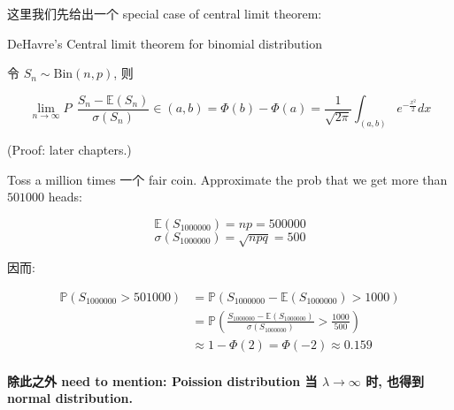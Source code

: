 \documentclass{qlnotes-export}
\begin{document}
这里我们先给出一个 special case of central limit theorem:

\begin{theorem}{DeHavre's Central limit theorem for binomial distribution}\label{thm-02-random-variables-dehavres-central-limit-theorem-for-binomial-distribution}

令 \(S_{n} \sim \text{Bin}(n,p)\), 则

\[\lim\limits_{n\rightarrow\infty}P\ \ \frac{S_{n} - {\mathbb{E}}(S_{n})}{\sigma(S_{n})} \in (a,b) = \Phi(b) - \Phi(a) = \frac{1}{\sqrt{2\pi}}\int_{(a,b)}e^{- \frac{x^{2}}{2}} dx\]

\end{theorem}

(Proof: later chapters.)

\begin{example}\label{ex-02-random-variables-example-012}

Toss a million times 一个 fair coin. Approximate the prob that we get more than \(501000\) heads:

\[{\mathbb{E}}(S_{1000000}) = np = 500000\]\[\sigma(S_{1000000}) = \sqrt{npq} = 500\]

因而:

\[\begin{matrix}
{{\mathbb{P}}(S_{1000000} > 501000)} & {= {\mathbb{P}}(S_{1000000} - {\mathbb{E}}(S_{1000000}) > 1000)} \\
 & {= {\mathbb{P}}\left( {\frac{S_{1000000} - {\mathbb{E}}(S_{1000000})}{\sigma(S_{1000000})} > \frac{1000}{500}} \right)} \\
 & {\approx 1 - \Phi(2) = \Phi( - 2) \approx 0.159}
\end{matrix}\]

\end{example}

\paragraph{\texorpdfstring{除此之外 need to mention: Poission distribution 当 \(\lambda\rightarrow\infty\) 时, 也得到 normal distribution.\\
}{除此之外 need to mention: Poission distribution 当 \textbackslash lambda\textbackslash rightarrow\textbackslash infty 时, 也得到 normal distribution. }}\label{ux9664ux6b64ux4e4bux5916-need-to-mention-poission-distribution-ux5f53-lambdarightarrowinfty-ux65f6-ux4e5fux5f97ux5230-normal-distribution.}
\end{document}
